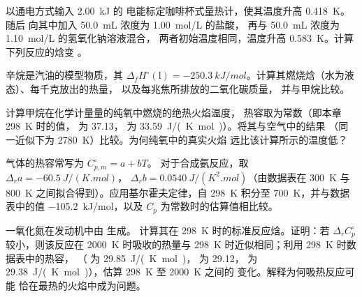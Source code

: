 \begin{exercise}[$\star\star$]\label{exo:b2:reaction-enthalpy:8}
以通电方式输入 \qty{2.00}{kJ} 的
电能标定咖啡杯式量热计，使其温度升高 \qty{0.418}{K}。随后
向其中加入 \qty{50.0}{mL} 浓度为 \qty{1.00}{mol/L} 的盐酸，
再与 \qty{50.0}{mL} 浓度为 \qty{1.10}{mol/L} 的氢氧化钠溶液混合，
两者初始温度相同，温度升高
\qty{0.583}{K}。计算下列反应的焓变 。
\end{exercise}

\begin{exercise}[$\star\star$]\label{exo:b2:reaction-enthalpy:9}
辛烷是汽油的模型物质，其 $\Delta_f H^\circ(\text{l}) =
\qty{-250.3}{kJ/mol}$。计算其燃烧焓（水为液态）、每千克放出的热量，
以及每兆焦所排放的二氧化碳质量，
并与甲烷比较。
\end{exercise}

\begin{exercise}[$\star\star\star$]\label{exo:b2:reaction-enthalpy:10}
计算甲烷在化学计量量的纯氧中燃烧的绝热火焰温度，
热容取为常数（即本章 \qty{298}{K} 时的值，
 为 37.13， 为
\qty{33.59}{J/(K.mol)}）。将其与空气中的结果
（同一近似下为 \qty{2780}{K}）比较。为何纯氧中的真实火焰
远比该计算所示的温度低？
\end{exercise}

\begin{exercise}[$\star\star\star$]\label{exo:b2:reaction-enthalpy:11}
气体的热容常写为 $C_{p,m}^\circ = a + bT$。
对于合成氨反应，取 $\Delta_r a = \qty{-60.5}{J/(K.mol)}$，
$\Delta_r b = \qty{0.0540}{J/(K^2.mol)}$（由数据表在
\qty{300}{K} 与 \qty{800}{K} 之间拟合得到）。应用基尔霍夫定律，自
\qty{298}{K} 积分至 \qty{700}{K}，并与数据表中的值
\qty{-105.2}{kJ/mol}，以及 $C_p$ 为常数时的估算值相比较。
\end{exercise}

\begin{exercise}[$\star\star\star$]\label{exo:b2:reaction-enthalpy:12}
一氧化氮在发动机中由  生成。
计算其在 \qty{298}{K} 时的标准反应焓。证明：若
$\Delta_r C_p^\circ$ 较小，则该反应在
\qty{2000}{K} 时吸收的热量与 \qty{298}{K} 时近似相同；利用 \qty{298}{K} 时数据表中的热容，
（ 为 \qty{29.85}{J/(K.mol)}， 为 29.12，
为 \qty{29.38}{J/(K.mol)}），估算 \qty{298}{K} 至 \qty{2000}{K} 之间的
变化。解释为何吸热反应可能
恰在最热的火焰中成为问题。
\end{exercise}

